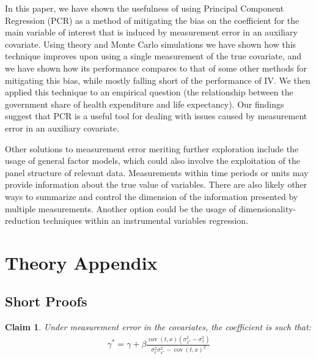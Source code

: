 \documentclass[10pt]{article}
\newtheorem{claim}{Claim}
\begin{document}
        In this paper, we have shown the usefulness of using Principal Component Regression (PCR) as a method of mitigating the bias on the coefficient for the main variable of interest that is induced by measurement error in an auxiliary covariate. Using theory and Monte Carlo simulations we have shown how this technique improves upon using a single measurement of the true covariate, and we have shown how its performance compares to that of some other methods for mitigating this bias, while mostly falling short of the performance of IV. We then applied this technique to an empirical question (the relationship between the government share of health expenditure and life expectancy). Our findings suggest that PCR is a useful tool for dealing with issues caused by measurement error in an auxiliary covariate.

        Other solutions to measurement error meriting further exploration include the usage of general factor models, which could also involve the exploitation of the panel structure of relevant data. Measurements within time periods or units may provide information about the true value of variables. There are also likely other ways to summarize and control the dimension of the information presented by multiple measurements. Another option could be the usage of dimensionality-reduction techniques within an instrumental variables regression.

    \clearpage \newpage

    
    

    \clearpage \newpage

    \appendix

	\section*{Theory Appendix}
	\subsection*{Short Proofs}

\setcounter{claim}{0}
\setcounter{claimproof}{0}

	\begin{claim}
	Under measurement error in the covariates, the coefficient is such that:
	\begin{align}
            \gamma^* = \gamma + \beta\frac{\operatorname{cov}(t,x)(\sigma^2_{x^*}-\sigma^2_x)}{\sigma_{t}^2\sigma_{x^*}^2-\operatorname{cov}({t,x})^2}
        \end{align}
	\end{claim}
	
\end{document}

